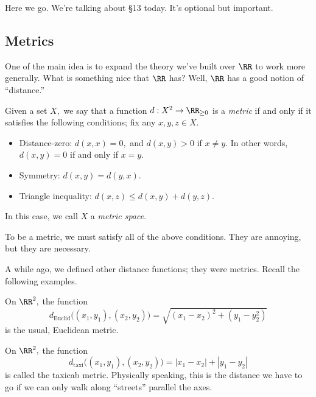
















Here we go. We're talking about \S13 today. It's optional but important.

\subsection{Metrics}
One of the main idea is to expand the theory we've built over $\RR$ to work more generally. What is something nice that $\RR$ has? Well, $\RR$ has a good notion of ``distance.''
\begin{definition}
    Given a set $X,$ we say that a function $d:X^2\to\RR_{\ge0}$ is a \textit{metric} if and only if it satisfies the following conditions; fix any $x,y,z\in X.$
    \begin{itemize}
        \item Distance-zero: $d(x,x)=0,$ and $d(x,y)>0$ if $x\ne y.$ In other words, $d(x,y)=0$ if and only if $x=y.$
        \item Symmetry: $d(x,y)=d(y,x).$
        \item Triangle inequality: $d(x,z)\le d(x,y)+d(y,z).$
    \end{itemize}
    In this case, we call $X$ a \textit{metric space}.
\end{definition}
\begin{warn}
    To be a metric, we must satisfy all of the above conditions. They are annoying, but they are necessary.
\end{warn}
A while ago, we defined other distance functions; they were metrics. Recall the following examples.
\begin{example}
    On $\RR^2,$ the function
    \[d_{\text{Euclid}}\big((x_1,y_1),(x_2,y_2)\big)=\sqrt{(x_1-x_2)^2+(y_1-y_2^2)}\]
    is the usual, Euclidean metric.
\end{example}
\begin{example}
    On $\RR^2,$ the function
    \[d_{\text{taxi}}\big((x_1,y_1),(x_2,y_2)\big)=|x_1-x_2|+|y_1-y_2|\]
    is called the taxicab metric. Physically speaking, this is the distance we have to go if we can only walk along ``streets'' parallel the axes.
\end{example}
